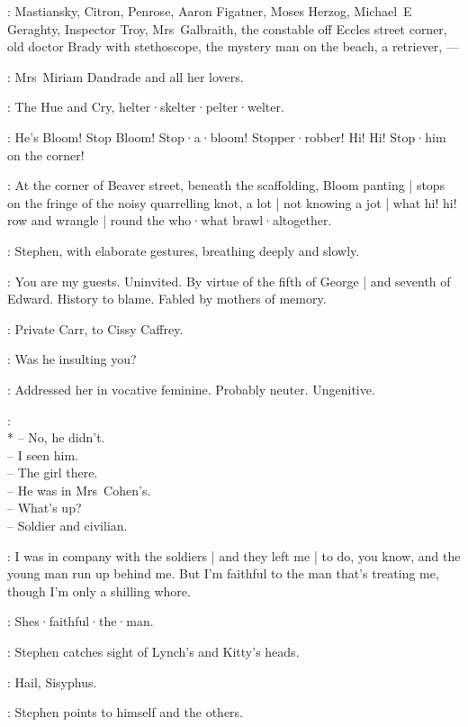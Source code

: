 :
Mastiansky,
Citron,
Penrose,
Aaron Figatner,
Moses Herzog,
Michael~E Geraghty,
Inspector Troy,
Mrs~Galbraith,
the constable off Eccles street corner,
old doctor Brady with stethoscope,
the mystery man on the beach,
a retriever,
---

:
Mrs~Miriam Dandrade and all her lovers.

:
The Hue and Cry,
helter·skelter·pelter·welter.

\HueCry:
He's Bloom!
Stop Bloom!
Stop·a·bloom!
Stopper·robber!
Hi!
Hi!
Stop·him on the corner!


:
At the corner of Beaver street,
beneath the scaffolding,
Bloom panting |
stops on the fringe of the noisy quarrelling knot,
a lot |
not knowing a jot |
what hi!
hi!
row and wrangle |
round the who·what brawl·altogether.

:
Stephen,
with elaborate gestures,
breathing deeply and slowly.

\Stephen:
You are my guests.
Uninvited.
By virtue of the fifth of George |
and seventh of Edward.
History to blame.
Fabled by mothers of memory.

:
Private Carr,
to Cissy Caffrey.

\Carr:
Was he insulting you?

\Stephen:
Addressed her in vocative feminine.
Probably neuter.
Ungenitive.

\Voices:\\*
-- No, he didn't.\\
-- I seen him.\\
-- The girl there.\\
-- He was in Mrs~Cohen's.\\
-- What's up?\\
-- Soldier and civilian.

\Cissy[7b]:
%
I was in company with the soldiers |
and they left me |
to do,
you know,
and the young man run up behind me.
But I'm faithful to the man that's treating me,
though I'm only a shilling whore.

\Voices:
Shes·faithful·the·man.

:
Stephen catches sight of Lynch's and Kitty's heads.

\Stephen:
Hail,
Sisyphus.

:
Stephen points to himself and the others.

